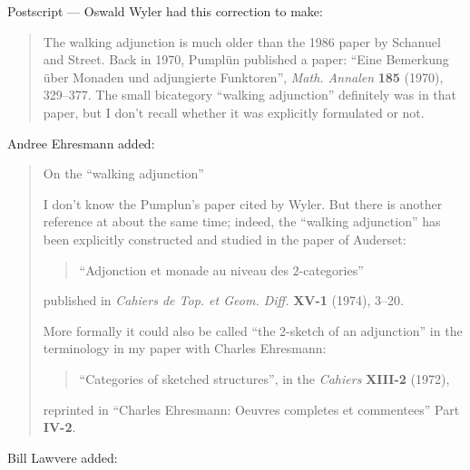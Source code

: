 \documentclass{article}
\begin{document}
Postscript --- Oswald Wyler had this correction to make:

\begin{quote}
The walking adjunction is much older than the 1986 paper by Schanuel and
Street. Back in 1970, Pumplün published a paper: ``Eine Bemerkung über
Monaden und adjungierte Funktoren'', \emph{Math. Annalen} \textbf{185}
(1970), 329--377. The small bicategory ``walking adjunction'' definitely
was in that paper, but I don't recall whether it was explicitly
formulated or not.
\end{quote}

Andree Ehresmann added:

\begin{quote}
On the ``walking adjunction''

I don't know the Pumplun's paper cited by Wyler. But there is another
reference at about the same time; indeed, the ``walking adjunction'' has
been explicitly constructed and studied in the paper of Auderset:

\begin{quote}
``Adjonction et monade au niveau des \(2\)-categories''
\end{quote}

published in \emph{Cahiers de Top. et Geom. Diff.} \textbf{XV-1} (1974),
3--20.

More formally it could also be called ``the 2-sketch of an adjunction''
in the terminology in my paper with Charles Ehresmann:

\begin{quote}
``Categories of sketched structures'', in the \emph{Cahiers}
\textbf{XIII-2} (1972),
\end{quote}

reprinted in ``Charles Ehresmann: Oeuvres completes et commentees'' Part
\textbf{IV-2}.
\end{quote}

Bill Lawvere added:
\end{document}
